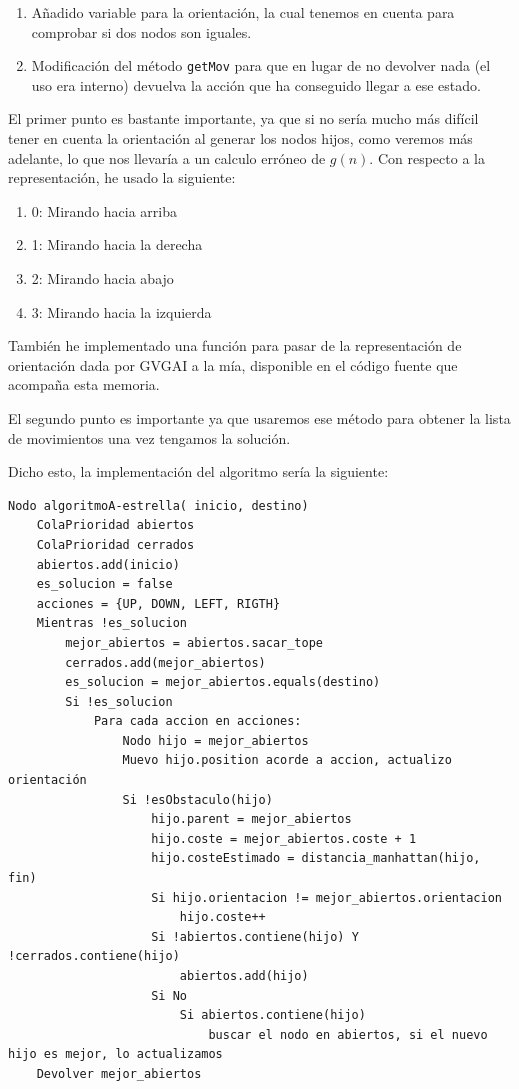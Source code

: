 \documentclass[10pt, spanish]{article}
\begin{document}
\begin{enumerate}
	\item Añadido variable para la orientación, la cual tenemos en cuenta para comprobar si dos nodos son iguales.
	\item Modificación del método \texttt{getMov} para que en lugar de no devolver nada (el uso era interno) devuelva la acción que ha conseguido llegar a ese estado.
\end{enumerate}

El primer punto es bastante importante, ya que si no sería mucho más difícil tener en cuenta la orientación al generar los nodos hijos, como veremos más adelante, lo que nos llevaría a un calculo erróneo de $g(n)$. Con respecto a la representación, he usado la siguiente:

\begin{enumerate}
	\item 0: Mirando hacia arriba
	\item 1: Mirando hacia la derecha
	\item 2: Mirando hacia abajo
	\item 3: Mirando hacia la izquierda
\end{enumerate}

También he implementado una función para pasar de la representación de orientación dada por GVGAI a la mía, disponible en el código fuente que acompaña esta memoria.

El segundo punto es importante ya que usaremos ese método para obtener la lista de movimientos una vez tengamos la solución.

Dicho esto, la implementación del algoritmo sería la siguiente:

\begin{lstlisting}
Nodo algoritmoA-estrella( inicio, destino)
	ColaPrioridad abiertos
	ColaPrioridad cerrados
	abiertos.add(inicio)
	es_solucion = false
	acciones = {UP, DOWN, LEFT, RIGTH}
	Mientras !es_solucion
		mejor_abiertos = abiertos.sacar_tope
		cerrados.add(mejor_abiertos)
		es_solucion = mejor_abiertos.equals(destino)
		Si !es_solucion
			Para cada accion en acciones:
				Nodo hijo = mejor_abiertos
				Muevo hijo.position acorde a accion, actualizo orientación
				Si !esObstaculo(hijo)
					hijo.parent = mejor_abiertos
					hijo.coste = mejor_abiertos.coste + 1
					hijo.costeEstimado = distancia_manhattan(hijo, fin)
					Si hijo.orientacion != mejor_abiertos.orientacion
						hijo.coste++
					Si !abiertos.contiene(hijo) Y !cerrados.contiene(hijo)
						abiertos.add(hijo)
					Si No
						Si abiertos.contiene(hijo)
							buscar el nodo en abiertos, si el nuevo hijo es mejor, lo actualizamos
	Devolver mejor_abiertos
\end{lstlisting}
\end{document}
